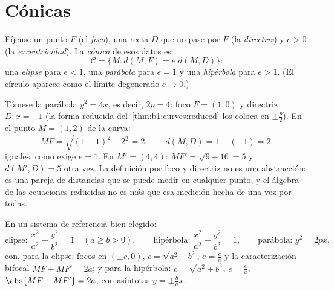 \section{Cónicas}

\begin{definition}\label{def:b1:curves:conics}
Fíjense un punto $F$ (el \emph{foco}), una recta $D$ que no pase por
$F$ (la \emph{directriz}) y $e > 0$ (la \emph{excentricidad}). La
\emph{cónica} de esos datos es
\[
\mathcal{C} = \{M : d(M, F) = e\; d(M, D)\}:
\]
una \emph{elipse} para $e < 1$, una \emph{parábola} para $e = 1$ y
una \emph{hipérbola} para $e > 1$. (El círculo aparece como el límite
degenerado $e \to 0$.)
\end{definition}

\begin{example}
\label{ex:b1:curves:parabolacheck}
Tómese la parábola $y^2 = 4x$, es decir, $2p = 4$: foco $F = (1, 0)$
y directriz $D : x = -1$ (la forma reducida
del~\cref{thm:b1:curves:reduced} los coloca en $\pm\frac p2$). En el
punto $M = (1, 2)$ de la curva:
\[
MF = \sqrt{(1-1)^2 + 2^2} = 2,
\qquad
d(M, D) = 1 - (-1) = 2 :
\]
iguales, como exige $e = 1$. En $M' = (4, 4)$:
$MF' = \sqrt{9 + 16} = 5$ y $d(M', D) = 5$ otra vez. La definición
por foco y directriz no es una abstracción: es una pareja de
distancias que se puede medir en cualquier punto, y el álgebra de las
ecuaciones reducidas no es más que esa medición hecha de una vez por
todas.
\end{example}

\begin{theorem}\label{thm:b1:curves:reduced}
En un sistema de referencia  bien elegido:
\[
\text{elipse: } \frac{x^2}{a^2} + \frac{y^2}{b^2} = 1
\quad (a \geq b > 0),
\qquad
\text{hipérbola: } \frac{x^2}{a^2} - \frac{y^2}{b^2} = 1,
\qquad
\text{parábola: } y^2 = 2px,
\]
con, para la elipse: focos en $(\pm c, 0)$, $c = \sqrt{a^2 - b^2}$,
$e = \frac ca$ y la caracterización bifocal $MF + MF' = 2a$; y para
la hipérbola: $c = \sqrt{a^2 + b^2}$, $e = \frac ca$,
$\abs{MF - MF'} = 2a$, con asíntotas $y = \pm\frac ba x$.
\end{theorem}

